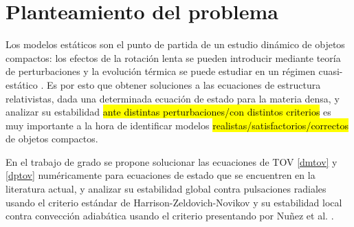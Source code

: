 \chapter{Planteamiento del problema}

Los modelos estáticos son el punto de partida de un estudio dinámico de objetos compactos: los efectos de la rotación lenta se pueden introducir mediante teoría de perturbaciones \cite{Hartle1967} y la evolución térmica se puede estudiar en un régimen cuasi-estático \cite{Becerra2015Quasi-staticObjects}. Es por esto que obtener soluciones a las ecuaciones de estructura relativistas, dada una determinada ecuación de estado para la materia densa, y analizar su estabilidad \hl{ante distintas perturbaciones/con distintos criterios} es muy importante a la hora de identificar modelos \hl{realistas/satisfactorios/correctos} de objetos compactos.

En el trabajo de grado se propone solucionar las ecuaciones de TOV \eqref{dmtov} y \eqref{dptov} numéricamente para ecuaciones de estado que se encuentren en la literatura actual, y analizar su estabilidad global contra pulsaciones radiales usando el criterio estándar de Harrison-Zeldovich-Novikov y su estabilidad local contra convección adiabática usando el criterio presentando por Nuñez et al. \cite{Hernandez2018}.
